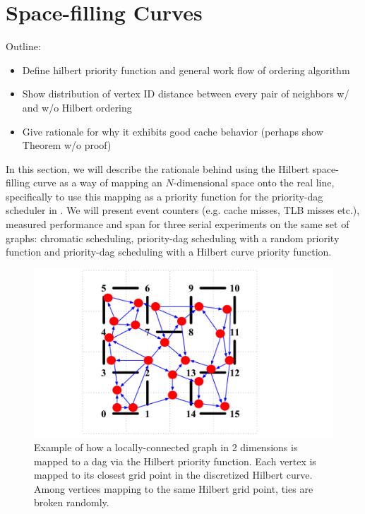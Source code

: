 \section{Space-filling Curves}
\label{sec:hilbert}

Outline:
\begin{itemize}
\item Define hilbert priority function and general work flow of ordering algorithm
\item Show distribution of vertex ID distance between every pair of neighbors w/ and w/o Hilbert ordering
\item Give rationale for why it exhibits good cache behavior (perhaps show Theorem w/o proof)
\end{itemize}



In this section, we will describe the rationale behind using the
Hilbert space-filling curve as a way of mapping an $N$-dimensional
space onto the real line, specifically to use this mapping as a
priority function for the priority-dag scheduler in .
We will present event counters (e.g. cache misses, TLB misses etc.), 
measured performance and span for three serial experiments on the same
set of graphs: chromatic scheduling, priority-dag scheduling with
a random priority function and priority-dag scheduling with a
Hilbert curve priority function.  

\begin{figure}[h]
\centering
\includegraphics[width=5in]{hilbert_priority_function.pdf}
\caption{Example of how a locally-connected graph in 2 dimensions
is mapped to a dag via the Hilbert priority function.  Each
vertex is mapped to its closest grid point in the discretized
Hilbert curve.  Among vertices mapping to the same Hilbert grid
point, ties are broken randomly.}
\label{fig:hilbert_priority}
\end{figure}




